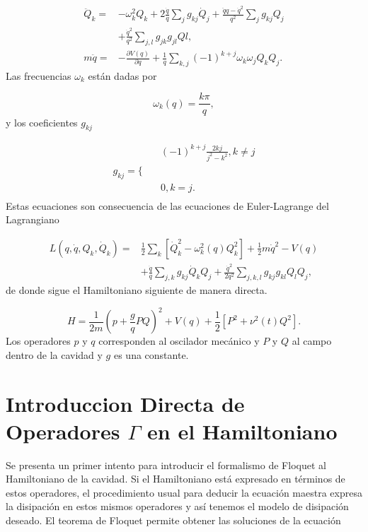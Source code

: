 \documentclass[10pt,a4paper]{report}
\begin{document}
\begin{align}\label{RegularModesEq}
\ddot{Q}_k =& -\omega^2_k Q_k + 2\frac{\dot{q}}{q} \sum_j g_{kj}\dot{Q}_j +\frac{\ddot{q}q-\dot{q}^2}{q^2} \sum_j g_{kj}Q_j\\
&+ \frac{\dot{q}^2}{q^2}\sum_{j,l} g_{jk}g_{jl}Ql,\nonumber \\
m\ddot{q} =& -\frac{\partial V(q)}{\partial q} + \frac{1}{q}\sum_{k,j}(-1)^{k+j}\omega_k \omega_j Q_k Q_j.
\end{align} Las frecuencias $\omega_k$ están dadas por

\begin{equation}
\omega_k (q) = \frac{k\pi}{q},
\end{equation} y los coeficientes $g_{kj}$

\begin{align}
&(-1)^{k+j} \frac{2kj}{j^2-k^2}, k \neq j \\
g_{kj} = \Big \{\quad \nonumber &\\
& 0, k = j.\nonumber\\
\end{align} Estas ecuaciones son consecuencia de las ecuaciones de Euler-Lagrange del Lagrangiano 

\begin{align}
L(q,\dot{q},Q_k,\dot{Q}_k) =& \frac{1}{2} \sum_k [\dot{Q}_k^2-\omega_k^2(q)Q_k^2] + \frac{1}{2}m\dot{q}^2 - V(q)\\
&+\frac{\dot{q}}{q} \sum_{j,k} g_{kj}\dot{Q}_k Q_j + \frac{\dot{q}^2}{2q^2}\sum_{j,k,l} g_{kj}g_{kl}Q_l Q_j, \nonumber 
\end{align}
de donde sigue el Hamiltoniano siguiente de manera directa.

\begin{equation}\label{LawHamiltonian}
H = \frac{1}{2m}(p + \frac{g}{q} PQ)^2 + V(q) + \frac{1}{2}[P^2+\nu^2 (t)Q^2].
\end{equation}
Los operadores $p$ y $q$ corresponden al oscilador mecánico y $P$ y
$Q$ al campo dentro de la cavidad  y $g$ es una constante. 

\section{Introduccion Directa de Operadores $\Gamma$ en el Hamiltoniano}

Se presenta un primer intento para introducir el formalismo de Floquet
al Hamiltoniano de la cavidad. Si el Hamiltoniano está expresado en términos de estos operadores, el procedimiento usual para deducir la ecuación maestra expresa la disipación en estos mismos operadores y así tenemos el modelo de disipación deseado. El teorema de Floquet permite obtener las soluciones de
la ecuación
\end{document}
